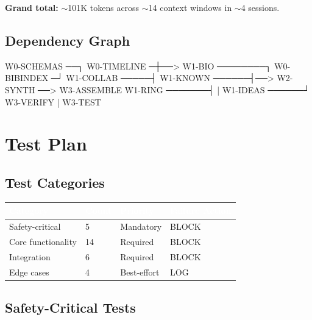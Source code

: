 \documentclass[11pt,letterpaper]{article}
\newcommand{\tableheader}[1]{\textbf{\sffamily\textcolor{white}{#1}}}
\begin{document}
\textbf{Grand total:} $\sim$101K tokens across $\sim$14 context windows in $\sim$4 sessions.

\subsection{Dependency Graph}

\begin{asciibox}
  W0-SCHEMAS ──┐
  W0-TIMELINE ─┼──> W1-BIO ────────┐
  W0-BIBINDEX ─┘    W1-COLLAB ─────┤
                    W1-KNOWN ──────┤──> W2-SYNTH ──> W3-ASSEMBLE
                    W1-RING ───────┤                    |
                    W1-IDEAS ──────┘               W3-VERIFY
                                                       |
                                                   W3-TEST
\end{asciibox}

\section{Test Plan}

\subsection{Test Categories}

\begin{center}
\begin{tabularx}{\textwidth}{L{3cm}C{1.5cm}C{1.5cm}C{2cm}}
\toprule
{}
\tableheader{Category} & \tableheader{Count} & \tableheader{Priority} & \tableheader{Failure Action} \\
\midrule
Safety-critical & 5 & Mandatory & BLOCK \\
Core functionality & 14 & Required & BLOCK \\
Integration & 6 & Required & BLOCK \\
Edge cases & 4 & Best-effort & LOG \\
\bottomrule
\end{tabularx}
\end{center}

\subsection{Safety-Critical Tests}
\end{document}
